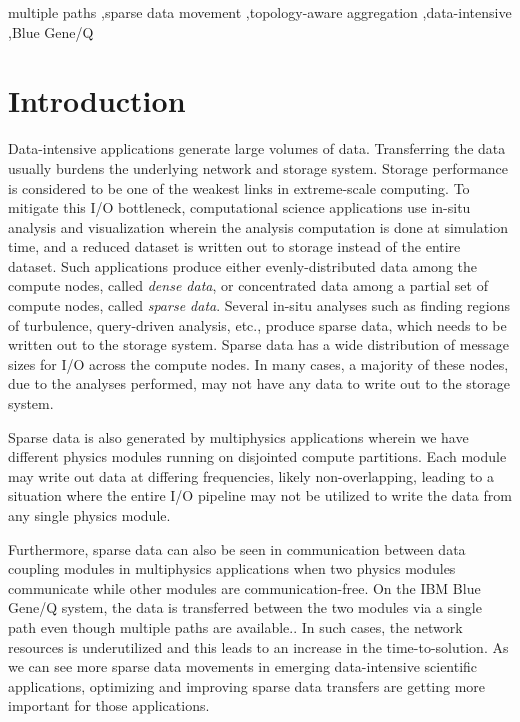 \documentclass[final,5p,times]{elsarticle}
\begin{document}
\begin{frontmatter}
\begin{abstract}
\end{abstract}

\begin{keyword}
multiple paths \sep sparse data movement \sep topology-aware aggregation \sep data-intensive \sep Blue Gene/Q



\end{keyword}

\end{frontmatter}


\section{Introduction}

Data-intensive applications generate large volumes of data. Transferring the data usually burdens the underlying network and storage system. Storage performance is considered to be one of the weakest links in extreme-scale computing. To mitigate this I/O bottleneck, computational science applications use in-situ analysis and visualization wherein the analysis computation is done at simulation time, and a reduced dataset is written out to storage instead of the entire dataset. Such applications produce either evenly-distributed data among the compute nodes, called {\em dense data}, or concentrated data among a partial set of compute nodes, called {\em sparse data}. Several in-situ analyses such as finding regions of turbulence, query-driven analysis, etc., produce sparse data, which needs to be written out to the storage system. Sparse data has a wide distribution of message sizes for I/O across the compute nodes. In many cases, a majority of these nodes, due to the analyses performed, may not have any data to write out to the storage system.

Sparse data is also generated by multiphysics applications wherein we have different physics modules running on disjointed compute partitions. Each module may write out data at differing frequencies, likely non-overlapping, leading to a situation where the entire I/O pipeline may not be utilized to write the data from any single physics module.

Furthermore, sparse data can also be seen in communication between data coupling modules in multiphysics applications when two physics modules communicate while other modules are communication-free. On the IBM Blue Gene/Q system, the data is transferred between the two modules via a single path even though multiple paths are available.. In such cases, the network resources is underutilized and this leads to an increase in the time-to-solution. As we can see more sparse data movements in emerging data-intensive scientific applications, optimizing and improving sparse data transfers are getting more important for those applications.
\end{document}
